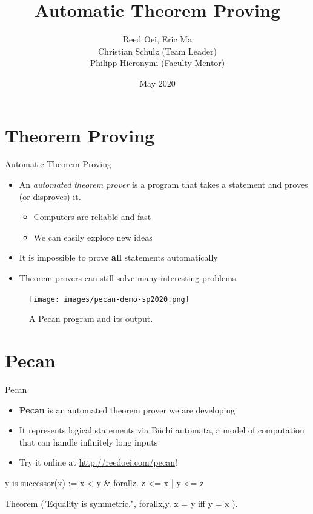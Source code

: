 \documentclass[leqno,presentation,usenames,dvipsnames]{beamer}
\title{Automatic Theorem Proving}
\author[names]{%
    Reed Oei, Eric Ma \\ 
    Christian Schulz (Team Leader) \\ 
    Philipp Hieronymi (Faculty Mentor)
}
\institute{%
    University of Illinois at Urbana-Champaign, Illinois Geometry Lab 
}
\date{May 2020}
\begin{document}
\frame{\titlepage}

\section{Theorem Proving}

\begin{frame}{Automatic Theorem Proving}
    \begin{itemize}
        \item An \emph{automated theorem prover} is a program that takes a statement and proves (or disproves) it.
            \begin{itemize}
                \item Computers are reliable and fast
                \item We can easily explore new ideas
            \end{itemize}
            
        \item It is impossible to prove \textbf{all} statements automatically
        
        \item Theorem provers can still solve many interesting problems
    \end{itemize}
    
    \begin{figure}
        \centering
        \texttt{[image: images/pecan-demo-sp2020.png]}
        \caption{A Pecan program and its output.}
        \label{fig:pecan-ex}
    \end{figure}
\end{frame}

\section{Pecan}
\begin{frame}[fragile]{Pecan}

\begin{itemize}
    \item \textbf{Pecan} is an automated theorem prover we are developing
    \item It represents logical statements via B\"uchi automata, a model of computation that can handle infinitely long inputs
    \item Try it online at \url{http://reedoei.com/pecan}!
\end{itemize}
    
\begin{pecan}
y is successor(x) := x < y & forallz. z <= x | y <= z
\end{pecan}

\begin{pecan}
Theorem ("Equality is symmetric.", { 
    forallx,y. x = y iff y = x 
}).
\end{pecan}
\end{frame}
\end{document}
